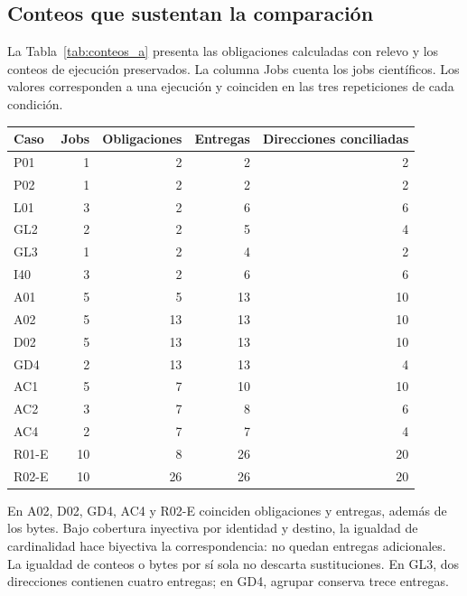\subsection{Conteos que sustentan la comparación}
\label{sec:conteos_a}
La Tabla~\ref{tab:conteos_a} presenta las obligaciones calculadas con relevo y los conteos de ejecución preservados. La columna Jobs cuenta los jobs científicos. Los valores corresponden a una ejecución y coinciden en las tres repeticiones de cada condición.

\begin{center}
\begin{minipage}{\linewidth}
\centering\small
\captionsetup{hypcap=false}
\label{tab:conteos_a}
\begin{tabular}{@{}lrrrr@{}}
\toprule Caso & Jobs & Obligaciones & Entregas & Direcciones conciliadas\\\midrule
P01 & 1 & 2 & 2 & 2\\
P02 & 1 & 2 & 2 & 2\\
L01 & 3 & 2 & 6 & 6\\
GL2 & 2 & 2 & 5 & 4\\
GL3 & 1 & 2 & 4 & 2\\
I40 & 3 & 2 & 6 & 6\\
A01 & 5 & 5 & 13 & 10\\
A02 & 5 & 13 & 13 & 10\\
D02 & 5 & 13 & 13 & 10\\
GD4 & 2 & 13 & 13 & 4\\
AC1 & 5 & 7 & 10 & 10\\
AC2 & 3 & 7 & 8 & 6\\
AC4 & 2 & 7 & 7 & 4\\
R01-E & 10 & 8 & 26 & 20\\
R02-E & 10 & 26 & 26 & 20\\
\bottomrule
\end{tabular}
\end{minipage}
\end{center}

En A02, D02, GD4, AC4 y R02-E coinciden obligaciones y entregas, además de los bytes. Bajo cobertura inyectiva por identidad y destino, la igualdad de cardinalidad hace biyectiva la correspondencia: no quedan entregas adicionales. La igualdad de conteos o bytes por sí sola no descarta sustituciones. En GL3, dos direcciones contienen cuatro entregas; en GD4, agrupar conserva trece entregas.
